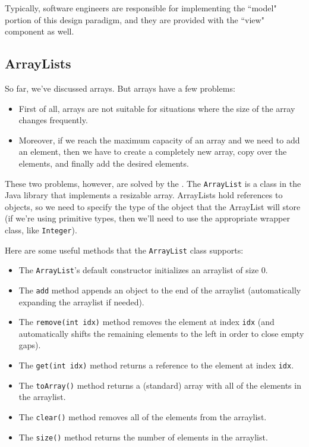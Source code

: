 Typically, software engineers are responsible for implementing the ``model" portion of this design paradigm, and they are provided with the ``view" component as well. 


\subsection{ArrayLists}

So far, we've discussed arrays. But arrays have a few problems:

\begin{itemize}
    \item First of all, arrays are not suitable for situations where the size of the array changes frequently.
    \item Moreover, if we reach the maximum capacity of an array and we need to add an element, then we have to create a completely new array, copy over the elements, and finally add the desired elements.
\end{itemize}

These two problems, however, are solved by the . The \verb!ArrayList! is a class in the Java library that implements a resizable array. ArrayLists hold references to objects, so we need to specify the type of the object that the ArrayList will store (if we're using primitive types, then we'll need to use the appropriate wrapper class, like \verb!Integer!). 

Here are some useful methods that the \verb!ArrayList! class supports:

\begin{itemize}
    \item The \verb!ArrayList!'s default constructor initializes an arraylist of size $0$.
    \item The \verb!add! method appends an object to the end of the arraylist (automatically expanding the arraylist if needed).
    \item The \verb!remove(int idx)! method removes the element at index \verb!idx! (and automatically shifts the remaining elements to the left in order to close empty gaps).
    \item The \verb!get(int idx)! method returns a reference to the element at index \verb!idx!. 
    \item The \verb!toArray()! method returns a (standard) array with all of the elements in the arraylist.
    \item The \verb!clear()! method removes all of the elements from the arraylist.
    \item The \verb!size()! method returns the number of elements in the arraylist.
\end{itemize}

